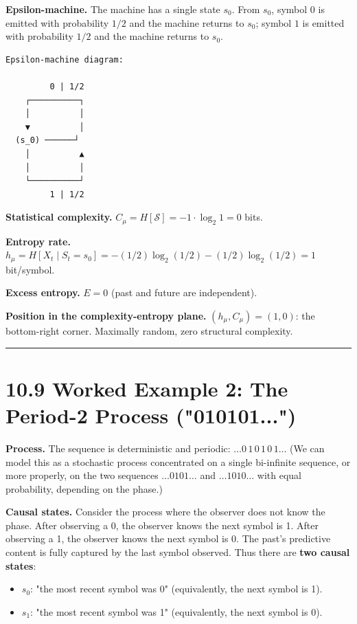 \textbf{Epsilon-machine.} The machine has a single state $s_0$. From $s_0$, symbol $0$ is emitted with probability $1/2$ and the machine returns to $s_0$; symbol $1$ is emitted with probability $1/2$ and the machine returns to $s_0$.

\begin{lstlisting}
Epsilon-machine diagram:

         0 | 1/2
    ┌──────────┐
    │          │
    ▼          │
  (s_0) ──────┘
    │          ▲
    │          │
    └──────────┘
         1 | 1/2
\end{lstlisting}

\textbf{Statistical complexity.} $C_\mu = H[\mathcal{S}] = -1 \cdot \log_2 1 = 0$ bits.

\textbf{Entropy rate.} $h_\mu = H[X_t \mid S_t = s_0] = -(1/2)\log_2(1/2) - (1/2)\log_2(1/2) = 1$ bit/symbol.

\textbf{Excess entropy.} $E = 0$ (past and future are independent).

\textbf{Position in the complexity-entropy plane.} $(h_\mu, C_\mu) = (1, 0)$: the bottom-right corner. Maximally random, zero structural complexity.

\bigskip\hrule\bigskip

\section{10.9 Worked Example 2: The Period-2 Process ("010101...")}

\textbf{Process.} The sequence is deterministic and periodic: $\ldots 0\, 1\, 0\, 1\, 0\, 1 \ldots$ (We can model this as a stochastic process concentrated on a single bi-infinite sequence, or more properly, on the two sequences $\ldots 0101\ldots$ and $\ldots 1010\ldots$ with equal probability, depending on the phase.)

\textbf{Causal states.} Consider the process where the observer does not know the phase. After observing a 0, the observer knows the next symbol is 1. After observing a 1, the observer knows the next symbol is 0. The past's predictive content is fully captured by the last symbol observed. Thus there are \textbf{two causal states}:

\begin{itemize}
  \item $s_0$: "the most recent symbol was 0" (equivalently, the next symbol is 1).
  \item $s_1$: "the most recent symbol was 1" (equivalently, the next symbol is 0).
\end{itemize}

